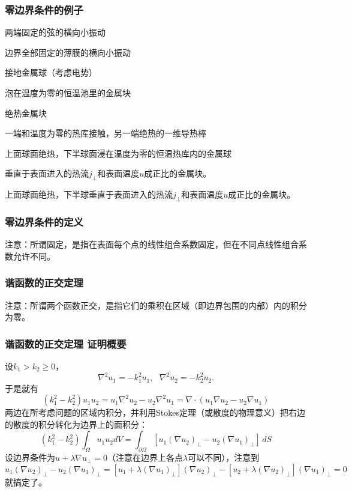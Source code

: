 \documentclass[CJK]{beamer}
\begin{document}
\begin{frame}
  \frametitle{零边界条件的例子}
  \bitem
\item{两端固定的弦的横向小振动}
\item{边界全部固定的薄膜的横向小振动}
\item{接地金属球（考虑电势）}    
\item{泡在温度为零的恒温池里的金属块}
\item{绝热金属块}
\item{一端和温度为零的热库接触，另一端绝热的一维导热棒}
\item{上面球面绝热，下半球面浸在温度为零的恒温热库内的金属球}
\item{垂直于表面进入的热流$j_{\perp}$和表面温度$u$成正比的金属块。}      
\item{上面球面绝热，下半球垂直于表面进入的热流$j_{\perp}$和表面温度$u$成正比的金属块。}      
  \eitem
\end{frame}

\begin{frame}
  \frametitle{零边界条件的定义}
  注意：{\blue 所谓固定，是指在表面每个点的线性组合系数固定，但在不同点线性组合系数允许不同。}
\end{frame}

\begin{frame}
  \frametitle{谐函数的正交定理}
  
  注意：{\blue 所谓两个函数正交，是指它们的乘积在区域（即边界包围的内部）内的积分为零。}
\end{frame}

\begin{frame}
  \frametitle{谐函数的正交定理 证明概要}
{\small
  设$k_1> k_2\ge 0$，
  $$ \nabla^2 u_1 = -k_1^2 u_1,\ \ \ \nabla^2 u_2 = -k_2^2 u_2.       $$
  于是就有
  $$(k_1^2-k_2^2)u_1u_2 = u_1\nabla^2 u_2 - u_2\nabla^2 u_1 = \nabla\cdot(u_1\nabla u_2 - u_2\nabla u_1)$$
  两边在所考虑问题的区域内积分，并利用Stokes定理（或散度的物理意义）把右边的散度的积分转化为边界上的面积分：
  $$(k_1^2-k_2^2)\int_\Omega u_1u_2 dV = \int_{\partial \Omega} \left[u_1(\nabla u_2)_{\perp} - u_2(\nabla u_1)_{\perp}\right]\, dS$$
  设边界条件为$ u + \lambda \nabla u_{\perp} = 0$（注意在边界上各点$\lambda$可以不同），注意到
  $$ u_1(\nabla u_2)_{\perp} - u_2(\nabla u_1)_{\perp} = \left[u_1+\lambda (\nabla u_1)_{\perp}\right](\nabla u_2)_{\perp} - \left[u_2+\lambda(\nabla u_2)_{\perp}\right](\nabla u_1)_{\perp} =0$$
  就搞定了。
  
  }
\end{frame}
\end{document}
